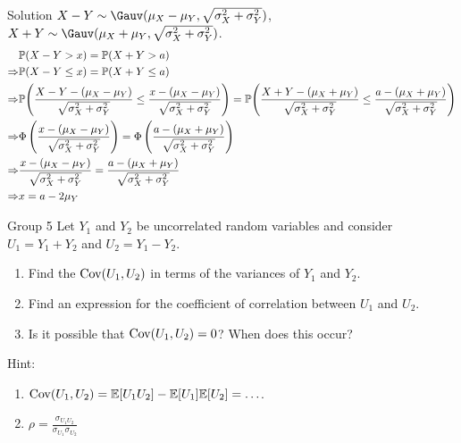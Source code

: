 \documentclass{article}
\begin{document}
\begin{solution}
    {Solution}
    $X-Y\sim \Gauv(\mu_X-\mu_Y,\sqrt{\sigma_X^2+\sigma_Y^2})$, $X+Y\sim \Gauv(\mu_X+\mu_Y,\sqrt{\sigma_X^2+\sigma_Y^2})$.
    \begin{align*}
        &\P{X-Y>x} = \P{X+Y>a} \\
        \Rightarrow
        &\P{X-Y\leq x} = \P{X+Y\leq a} \\
        \Rightarrow
        &\P{\frac{X-Y-(\mu_X-\mu_Y)}{\sqrt{\sigma_X^2+\sigma_Y^2}}\leq \frac{x-(\mu_X-\mu_Y)}{\sqrt{\sigma_X^2+\sigma_Y^2}}} = \P{\frac{X+Y-(\mu_X+\mu_Y)}{\sqrt{\sigma_X^2+\sigma_Y^2}}\leq \frac{a-(\mu_X+\mu_Y)}{\sqrt{\sigma_X^2+\sigma_Y^2}}} \\
        \Rightarrow
        &\Phi\left(\frac{x-(\mu_X-\mu_Y)}{\sqrt{\sigma_X^2+\sigma_Y^2}}\right) = \Phi\left(\frac{a-(\mu_X+\mu_Y)}{\sqrt{\sigma_X^2+\sigma_Y^2}}\right) \\
        \Rightarrow
        &\frac{x-(\mu_X-\mu_Y)}{\sqrt{\sigma_X^2+\sigma_Y^2}} = \frac{a-(\mu_X+\mu_Y)}{\sqrt{\sigma_X^2+\sigma_Y^2}} \\
        \Rightarrow
        &x = a-2\mu_Y
    \end{align*}
\end{solution}

\begin{problem}
    {Group 5}
    Let $Y_1$ and $Y_2$ be uncorrelated random variables and consider $U_1 = Y_1 + Y_2$ and $U_2 = Y_1 - Y_2$.
    \begin{enumerate}
        \item Find the $\mathop{\mathrm{Cov}}\nolimits(U_1, U_2)$ in terms of the variances of $Y_1$ and $Y_2$.
        \item Find an expression for the coefficient of correlation between $U_1$ and $U_2$.
        \item Is it possible that $\mathop{\mathrm{Cov}}\nolimits(U_1, U_2) = 0$? When does this occur?
    \end{enumerate}
    \begin{solution}
        {Hint:}
        \begin{enumerate}
            \item $\Cov(U_1,U_2)=\E{U_1U_2}-\E{U_1}\E{U_2}=\ldots$.
            \item $\rho=\frac{\sigma_{U_1U_2}}{\sigma_{U_1}\sigma_{U_2}}$
        \end{enumerate}
    \end{solution}
\end{problem}
\end{document}
